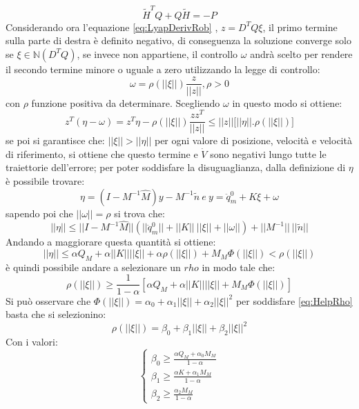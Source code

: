\begin{equation*}
\tilde{H}^TQ+Q\tilde{H} = -P
\end{equation*}
Considerando ora l'equazione \ref{eq:LyapDerivRob} , $z = D^TQ\xi$, il primo termine sulla parte di destra è definito negativo, di conseguenza la soluzione converge solo se $\xi \in \mathbb{N}(D^TQ)$, se invece non appartiene, il controllo $\omega$ andrà scelto per rendere il secondo termine minore o uguale a zero utilizzando la legge di controllo:
\begin{equation}
\omega = \rho(||\xi||)\frac{z}{||z||}, \rho >0
\end{equation}
con $\rho$ funzione positiva da determinare. Scegliendo $\omega$ in questo modo si ottiene:
\begin{equation*}
z^T(\eta-\omega) = z^T\eta - \rho(||\xi||)\frac{zz^T}{||z||} \le ||z||\big[||\eta||.\rho(||\xi||)\big]
\end{equation*}
se poi si garantisce che: $||\xi||>||\eta||$ per ogni valore di posizione, velocità e velocità di riferimento, si ottiene che questo termine e $\dot{V}$ sono negativi lungo tutte le traiettorie dell'errore; per poter soddisfare la disuguaglianza, dalla definizione di $\eta$ è possibile trovare:
\begin{equation}
\eta = (I-M^{-1}\hat{M})y-M^{-1}\tilde{n} \ e \ y = \ddot{q}^0_m + K\xi+\omega
\end{equation}
sapendo poi che $||\omega|| = \rho$ si trova che:
\begin{equation*}
||\eta|| \le ||I-M^{-1}\hat{M}|| (||\ddot{q}_m^0 ||+||K||\  ||\xi||+||\omega||)+||M^{-1}|| \ ||\tilde{n}||
\end{equation*}
Andando a maggiorare questa quantità si ottiene:
\begin{equation}
||\eta|| \le \alpha Q_M + \alpha ||K|| || \xi || + \alpha\rho(||\xi||)+M_M\Phi(||\xi||) < \rho(||\xi||)
\end{equation}
è quindi possibile andare a selezionare un $rho$ in modo tale che:
\begin{equation}
\rho(||\xi||) \ge \frac{1}{1-\alpha} [\alpha Q_M+\alpha ||K|| ||\xi||+M_M\Phi(||\xi||)]
\label{eq:HelpRho}
\end{equation}
Si può osservare che $\Phi(||\xi||) = \alpha_0+\alpha_1||\xi||+\alpha_2||\xi||^2$ per soddisfare \ref{eq:HelpRho} basta che si selezionino:
\begin{equation*}
\rho(||\xi||) = \beta_0 + \beta_1||\xi||+\beta_2||\xi||^2
\end{equation*}
Con i valori:
\begin{equation*}
\begin{cases}
\beta_0 \ge \frac{\alpha Q_M+\alpha_0M_M}{1-\alpha}\\
 \beta_1 \ge \frac{\alpha K +\alpha_1 M_M}{1-\alpha}\\
 \beta_2 \ge \frac{\alpha_2M_M}{1-\alpha}
\end{cases}
\end{equation*}
